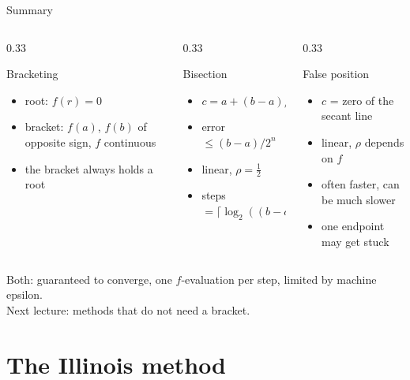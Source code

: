 \documentclass[aspectratio=169]{beamer}
\begin{document}
\begin{frame}{Summary}
\begin{columns}[T]
\begin{column}{0.33\textwidth}
\begin{block}{Bracketing}
\scriptsize
\begin{itemize}
  \item root: $f(r) = 0$
  \item bracket: $f(a)$, $f(b)$ of opposite sign, $f$ continuous
  \item the bracket always holds a root
\end{itemize}
\end{block}
\end{column}
\begin{column}{0.33\textwidth}
\begin{block}{Bisection}
\scriptsize
\begin{itemize}
  \item $c = a + (b-a)/2$
  \item error $\le (b-a)/2^n$
  \item linear, $\rho = \tfrac12$
  \item steps $= \lceil \log_2((b-a)/\text{tol}) \rceil$
\end{itemize}
\end{block}
\end{column}
\begin{column}{0.33\textwidth}
\begin{block}{False position}
\scriptsize
\begin{itemize}
  \item $c$ = zero of the secant line
  \item linear, $\rho$ depends on $f$
  \item often faster, can be much slower
  \item one endpoint may get stuck
\end{itemize}
\end{block}
\end{column}
\end{columns}
\vspace{0.4cm}
\centering
\small Both: guaranteed to converge, one $f$-evaluation per step, limited by machine epsilon.\\[3pt]
\scriptsize Next lecture: methods that do not need a bracket.
\end{frame}

\section{The Illinois method}
\end{document}
